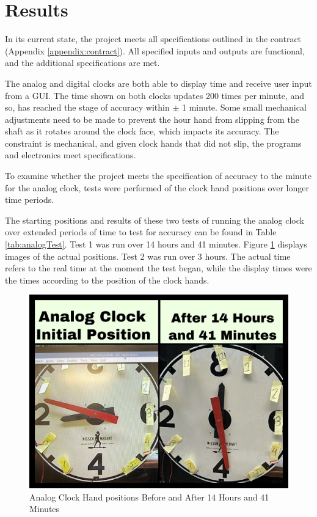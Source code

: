 \documentclass[11pt]{article}
\begin{document}
\section{Results}
\label{results}

In its current state, the project meets all specifications outlined in the contract (Appendix \ref{appendix:contract}). 
All specified inputs and outputs are functional, and the additional specifications are met. 

The analog and digital clocks are both able to display time and receive user input from a GUI. The time shown on both clocks updates 200 times per minute, and so, has reached the stage of accuracy within $\pm$ 1 minute. Some small mechanical adjustments need to be made to prevent the hour hand from slipping from the shaft as it rotates around the clock face, which impacts its accuracy. The constraint is mechanical, and given clock hands that did not slip, the programs and electronics meet specifications.


To examine whether the project meets the specification of accuracy to the minute for the analog clock, tests were performed of the clock hand positions over longer time periods. 

The starting positions and results of these two tests of running the analog clock over extended periods of time to test for accuracy can be found in Table \ref{tab:analogTest}. Test 1 was run over 14 hours and 41 minutes. Figure \ref{analogTest1} displays images of the actual positions. Test 2 was run over 3 hours. The actual time refers to the real time at the moment the test began, while the display times were the times according to the position of the clock hands. 

\begin{figure}[H]
\centering
\includegraphics[width=5in]{analogTest1.jpg}
\caption{Analog Clock Hand positions Before and After 14 Hours and 41 Minutes}
\label{analogTest1}
\end{figure}
\end{document}
